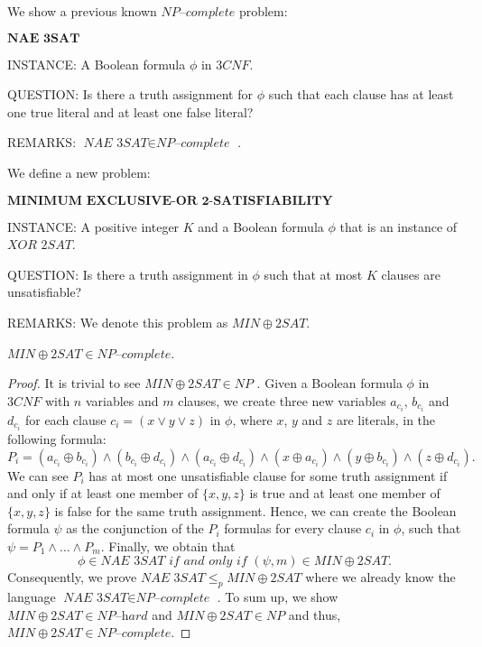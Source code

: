 \documentclass[a4paper,UKenglish,cleveref, autoref]{lipics-v2019}
\begin{document}
We show a previous known $\textit{NP--complete}$ problem:

\begin{definition}
$\textbf{NAE 3SAT}$

INSTANCE: A Boolean formula $\phi$ in $3CNF$.

QUESTION: Is there a truth assignment for $\phi$ such that each clause has at least one true literal and at least one false literal?

REMARKS: $\textit{NAE 3SAT} \in \textit{NP--complete}$ \cite{GJ79}.
\end{definition}

We define a new problem:

\begin{definition}
$\textbf{MINIMUM EXCLUSIVE-OR 2-SATISFIABILITY}$

INSTANCE: A positive integer $K$ and a Boolean formula $\phi$ that is an instance of $\textit{XOR 2SAT}$.

QUESTION: Is there a truth assignment in $\phi$ such that at most $K$ clauses are unsatisfiable?

REMARKS: We denote this problem as $MIN\oplus2SAT$.
\end{definition}


\begin{theorem}
\label{completeness}
$MIN\oplus2SAT \in \textit{NP--complete}$.
\end{theorem}

\begin{proof}
It is trivial to see $MIN\oplus2SAT \in NP$ \cite{Pap03}. Given a Boolean formula $\phi$ in $3CNF$ with $n$ variables and $m$ clauses, we create three new variables $a_{c_{i}}$, $b_{c_{i}}$ and $d_{c_{i}}$ for each clause $c_{i} = (x \vee y \vee z)$ in $\phi$, where $x$, $y$ and $z$ are literals, in the following formula:
\[P_{i} = (a_{c_{i}} \oplus b_{c_{i}}) \wedge (b_{c_{i}} \oplus d_{c_{i}}) \wedge (a_{c_{i}} \oplus d_{c_{i}}) \wedge (x \oplus a_{c_{i}}) \wedge (y \oplus b_{c_{i}}) \wedge (z \oplus d_{c_{i}}).\]
We can see $P_{i}$ has at most one unsatisfiable clause for some truth assignment if and only if at least one member of $\{x,y,z\}$ is true and at least one member of $\{x,y,z\}$ is false for the same truth assignment. Hence, we can create the Boolean formula $\psi$ as the conjunction of the $P_{i}$ formulas for every clause $c_{i}$ in $\phi$, such that $\psi = P_{1} \wedge \ldots \wedge P_{m}$. Finally, we obtain that
\[\phi \in \textit{NAE 3SAT} \textit{ if and only if } (\psi, m) \in MIN\oplus2SAT.\]
Consequently, we prove $\textit{NAE 3SAT} \leq_{p} MIN\oplus2SAT$ where we already know the language $\textit{NAE 3SAT} \in \textit{NP--complete}$ \cite{GJ79}. To sum up, we show $MIN\oplus2SAT \in \textit{NP--hard}$ and $MIN\oplus2SAT \in NP$ and thus, $MIN\oplus2SAT \in \textit{NP--complete}$.
\end{proof}
\end{document}
